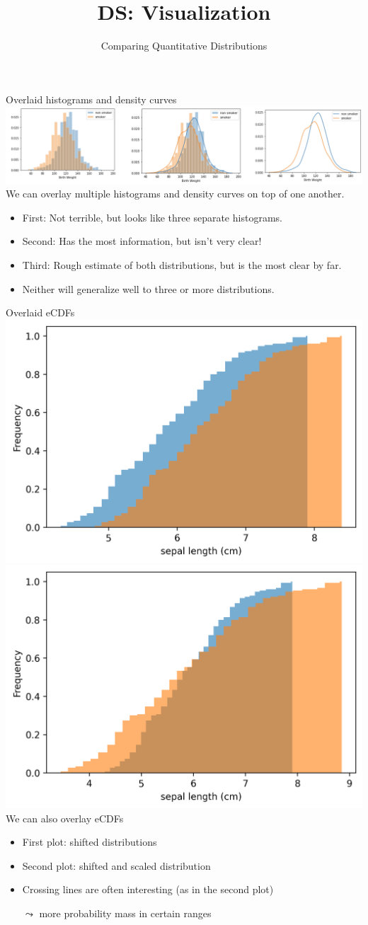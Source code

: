 \documentclass[aspectratio=169]{../latex_main/tntbeamer}  %
\title[Visualization]{DS: Visualization}
\subtitle{Comparing Quantitative Distributions}
\begin{document}
	
	\maketitle
	\begin{frame}{Overlaid histograms and density curves}
	    \includegraphics[scale=.35]{Bild42}\\
	    We can overlay multiple histograms and density curves on top of one another.
	    \begin{itemize}
	        \item First: Not terrible, but looks like three separate histograms.
	        \item Second: Has the most information, but isn’t very clear!
	        \item Third: Rough estimate of both distributions, but is the most clear by far.
	        \item Neither will generalize well to three or more distributions.
	    \end{itemize}
    \end{frame}
    
    \begin{frame}{Overlaid eCDFs}
        \includegraphics[width=.45\textwidth]{./figure/cdf_iris_sepal_length_shifted.png}
	    \includegraphics[width=.45\textwidth]{./figure/cdf_iris_sepal_length_shifted_scaled.png}\\
	    
	    We can also overlay eCDFs
	    \begin{itemize}
	        \item First plot: shifted distributions
	        \item Second plot: shifted and scaled distribution
	        \item Crossing lines are often interesting (as in the second plot)
	        \item[$\leadsto$] more probability mass in certain ranges
	    \end{itemize}
    \end{frame}
		
\end{document}
